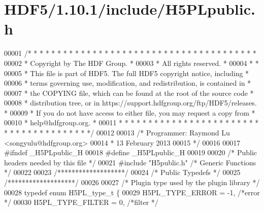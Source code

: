 \hypertarget{_h_d_f5_21_810_81_2include_2_h5_p_lpublic_8h_source}{}\section{H\+D\+F5/1.10.1/include/\+H5\+P\+Lpublic.h}
\label{_h_d_f5_21_810_81_2include_2_h5_p_lpublic_8h_source}

\begin{DoxyCode}
00001 \textcolor{comment}{/* * * * * * * * * * * * * * * * * * * * * * * * * * * * * * * * * * * * * * *}
00002 \textcolor{comment}{ * Copyright by The HDF Group.                                               *}
00003 \textcolor{comment}{ * All rights reserved.                                                      *}
00004 \textcolor{comment}{ *                                                                           *}
00005 \textcolor{comment}{ * This file is part of HDF5. The full HDF5 copyright notice, including      *}
00006 \textcolor{comment}{ * terms governing use, modification, and redistribution, is contained in    *}
00007 \textcolor{comment}{ * the COPYING file, which can be found at the root of the source code       *}
00008 \textcolor{comment}{ * distribution tree, or in https://support.hdfgroup.org/ftp/HDF5/releases.  *}
00009 \textcolor{comment}{ * If you do not have access to either file, you may request a copy from     *}
00010 \textcolor{comment}{ * help@hdfgroup.org.                                                        *}
00011 \textcolor{comment}{ * * * * * * * * * * * * * * * * * * * * * * * * * * * * * * * * * * * * * * */}
00012 
00013 \textcolor{comment}{/* Programmer:  Raymond Lu <songyulu@hdfgroup.org>}
00014 \textcolor{comment}{ *              13 February 2013}
00015 \textcolor{comment}{ */}
00016 
00017 \textcolor{preprocessor}{#ifndef \_H5PLpublic\_H}
00018 \textcolor{preprocessor}{#define \_H5PLpublic\_H}
00019 
00020 \textcolor{comment}{/* Public headers needed by this file */}
00021 \textcolor{preprocessor}{#include "H5public.h"}          \textcolor{comment}{/* Generic Functions                    */}
00022 
00023 \textcolor{comment}{/*******************/}
00024 \textcolor{comment}{/* Public Typedefs */}
00025 \textcolor{comment}{/*******************/}
00026 
00027 \textcolor{comment}{/* Plugin type used by the plugin library */}
00028 \textcolor{keyword}{typedef} \textcolor{keyword}{enum} H5PL\_type\_t \{
00029     H5PL\_TYPE\_ERROR        = -1,  \textcolor{comment}{/*error                    */}
00030     H5PL\_TYPE\_FILTER       = 0,   \textcolor{comment}{/*filter                   */}

\end{DoxyCode}
